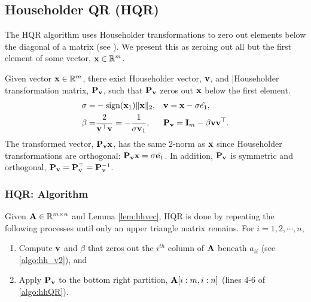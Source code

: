 \subsection{Householder QR (HQR)}\label{sec:HQR}
The HQR algorithm uses Householder transformations to zero out elements below the diagonal of a matrix (see \cite{Householder1958}). 
We present this as zeroing out all but the first element of some vector, $\mathbf{x}\in\mathbb{R}^m$.
\begin{lemma}
	Given vector $\mathbf{x}\in\mathbb{R}^{m}$, there exist Householder vector, $\mathbf{v}$, and |Householder transformation matrix, $\mathbf{P}_{\mathbf{v}}$, such that $\mathbf{P}_{\mathbf{v}}$ zeros out $\mathbf{x}$ below the first element. 
	\begin{equation}
	\begin{alignedat}{3} 
	\sigma =& -\rm{sign}(\bb{x}_1)\|\bb{x}\|_2, &&\quad  \bb{v} = \bb{x} -\sigma \hat{e_1},\\
	\beta = & \frac{2}{\bb{v}^{\top}\bb{v}}=-\frac{1}{\sigma\bb{v}_1}, && \quad \bb{P}_{\bb{v}}=  \bb{I}_{m} - \beta \bb{v}\bb{v}^{\top}.
	\end{alignedat}
	\label{eqn:HH} 
	\end{equation}
	The transformed vector, $\mathbf{P_vx}$, has the same 2-norm as $\mathbf{x}$ since Householder transformations are orthogonal: $\mathbf{P}_{\mathbf{v}}\mathbf{x} = \sigma\hat{\mathbf{e}_1}$.
	In addition, $\mathbf{P}_{\mathbf{v}}$ is symmetric and orthogonal, $\mathbf{P}_{\mathbf{v}}=\mathbf{P}_{\mathbf{v}}^{\top}=\mathbf{P}_{\mathbf{v}}^{-1}$.
	\label{lem:hhvec}
\end{lemma}
\subsubsection{HQR: Algorithm}
Given $\mathbf{A}\in\mathbb{R}^{m\times n}$ and Lemma \ref{lem:hhvec}, HQR is done by repeating the following processes until only an upper triangle matrix remains.
For $i = 1, 2, \cdots, n,$
\begin{enumerate}[Step 1)]
	\item Compute $\mathbf{v}$ and $\beta$ that zeros out the $i^{th}$ column of $\mathbf{A}$ beneath $a_{ii}$ (see \cref{algo:hh_v2}), and
	\item Apply $\mathbf{P}_{\mathbf{v}}$ to the bottom right partition, $\mathbf{A}[i:m, i:n]$ (lines 4-6 of \cref{algo:hhQR}).
\end{enumerate}

